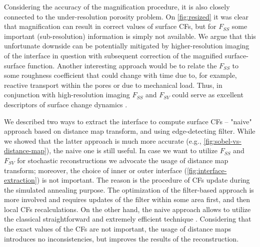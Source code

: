 \documentclass[reprint,amsmath,amssymb,aps,pre,showkeys,showpacs]{revtex4-1}
\begin{document}
Considering the accuracy of the magnification procedure, it is also closely
connected to the under-resolution porosity problem. On \cref{fig:resized}
it was clear that magnification can result in correct values of surface CFs, but
for $F_{SS}$ some important (sub-resolution) information is simply not
available. We argue that this unfortunate downside can be potentially mitigated
by higher-resolution imaging of the interface in question with subsequent
correction of the magnified surface-surface function. Another interesting
approach would be to relate the $F_{SS}$ to some roughness coefficient that
could change with time due to, for example, reactive transport within the pores
\cite{godinho2016,noiriel2021,prokhorov2022} or due to mechanical load. Thus, in
conjunction with high-resolution imaging $F_{SS}$ and $F_{SV}$ could serve as
excellent descriptors of surface change dynamics \cite{chen2022}.

We described two ways to extract the interface to compute surface CFs -- "naive"
approach based on distance map transform, and using edge-detecting filter. While
we showed that the latter approach is much more accurate (e.g.,
\cref{fig:sobel-vs-distance-map}), the naive one is still useful. In case we
want to utilize $F_{SS}$ and $F_{SV}$ for stochastic reconstructions
\cite{Y-T,JiaoPNAS,karsaninaPRL} we advocate the usage of distance map
transform; moreover, the choice of inner or outer interface
(\cref{fig:interface-extraction}) is not important. The reason is the procedure
of CFs update during the simulated annealing purpose. The optimization of the
filter-based approach is more involved and requires updates of the filter within
some area first, and then local CFs recalculations. On the other hand, the naive
approach allows to utilize the classical straightforward and extremely efficient
technique \cite{rozman2001}. Considering that the exact values of the CFs are
not important, the usage of distance maps introduces no inconsistencies, but
improves the results of the reconstruction.
\end{document}
